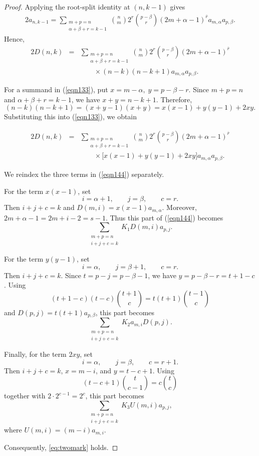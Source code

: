 \documentclass[10pt,a4paper]{amsart}
\begin{document}
\begin{proof} 
Applying the root-split identity at $(n,k-1)$ gives
\begin{eqnarray*}
2a_{n,k-1}
=
\sum_{\substack{m+p=n\\ \alpha+\beta+r=k-1}}
\binom{n}{m}2^r
\binom{p-\beta}{r}
(2m+\alpha-1)^{\overline r}
a_{m,\alpha}a_{p,\beta}.
\end{eqnarray*}
Hence,
\begin{eqnarray}
2D(n,k)
&={}&
\sum_{\substack{m+p=n\\ \alpha+\beta+r=k-1}}
\binom{n}{m}2^r
\binom{p-\beta}{r}
(2m+\alpha-1)^{\overline r}  \nonumber\\
& &\qquad{}\times
(n-k)(n-k+1)a_{m,\alpha}a_{p,\beta}.
\label{eqn133}
\end{eqnarray}

For a summand in (\ref{eqn133}), put $
x=m-\alpha,\; y=p-\beta-r$.
Since $m+p=n$ and $\alpha+\beta+r=k-1$, we have 
$x+y=n-k+1$.
Therefore,
\[
(n-k)(n-k+1)
=(x+y-1)(x+y)
=x(x-1)+y(y-1)+2xy.
\]
Substituting this into (\ref{eqn133}), we obtain

\begin{eqnarray}
2D(n,k)
&={}&
\sum_{\substack{m+p=n\\ \alpha+\beta+r=k-1}}
\binom{n}{m}2^r
\binom{p-\beta}{r}
(2m+\alpha-1)^{\overline r}  \nonumber \\
& &\qquad{}\times
\bigl[x(x-1)+y(y-1)+2xy\bigr]
a_{m,\alpha}a_{p,\beta}.
\label{eqn144}
\end{eqnarray}


We reindex the three terms in (\ref{eqn144}) separately.

For the term $x(x-1)$, set
\[
i=\alpha+1,\qquad j=\beta,\qquad c=r.
\]
Then $i+j+c=k$ and
$D(m,i)=x(x-1)a_{m,\alpha}$.
Moreover, $2m+\alpha-1=2m+i-2=s-1$.
Thus this part of (\ref{eqn144}) becomes
\[
\sum_{\substack{m+p=n\\i+j+c=k}}
K_1D(m,i)a_{p,j}.
\]

For the term $y(y-1)$, set
\[
i=\alpha,\qquad j=\beta+1,\qquad c=r.
\]
Then $i+j+c=k$. Since $t=p-j=p-\beta-1$, we have
$y=p-\beta-r=t+1-c$.
Using
\[
(t+1-c)(t-c)\binom{t+1}{c}
=
t(t+1)\binom{t-1}{c}
\]
and $D(p,j)=t(t+1)a_{p,\beta}$,
this part becomes
\[
\sum_{\substack{m+p=n\\i+j+c=k}}
K_2a_{m,i}D(p,j).
\]

Finally, for the term $2xy$, set
\[
i=\alpha,\qquad j=\beta,\qquad c=r+1.
\]
Then $i+j+c=k$, $x=m-i$, and $y=t-c+1$.
Using
\[
(t-c+1)\binom{t}{c-1}
=
c\binom{t}{c}
\]
together with $2\cdot2^{c-1}=2^c$, this part becomes
\[
\sum_{\substack{m+p=n\\i+j+c=k}}
K_3U(m,i)a_{p,j},
\]
where $U(m,i)=(m-i)a_{m,i}$.

 Consequently, \eqref{eq:twomark} holds.
\end{proof}
\end{document}

